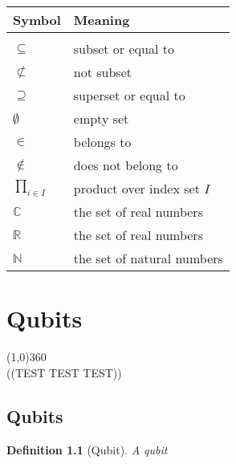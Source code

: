 \documentclass[12pt,twoside]{report}
\newtheorem{defn}[subsection]{Definition}
\begin{document}
\begin{tabular}{p{2cm}p{5cm}}
\textbf{Symbol} & \textbf{Meaning}\\
\hline
& \\
$\subseteq$ & subset or equal to \\%
$\not\subset$ & not subset\\%
$\supseteq$ & superset or equal to \\
$\emptyset$ & empty set\\%
$\in$ & belongs to\\%
$\not \in $ & does not belong to \\
$\displaystyle\prod_{i \in I}$ & product over index set $I$ \\
$\mathbb{C}$ & the set of real numbers\\%
$\mathbb{R}$ & the set of real numbers\\%
$\mathbb{N}$ & the set of natural numbers\\%
\end{tabular}

\tableofcontents
\newpage
{}

\chapter{Qubits}
\line(1,0){360} \\
((TEST TEST TEST))
\section{Qubits}
\begin{defn}[Qubit]
    A qubit
\end{defn}

\newpage
{}
\begin{thebibliography}{9}
        \lipsum[1][1-3]
        \lipsum[2][1-3]
        \lipsum[3][1-3]
        \lipsum[4][1-3]
        \lipsum[5][1-3]
        \lipsum[6][1-3]
\end{thebibliography}
\end{document}

